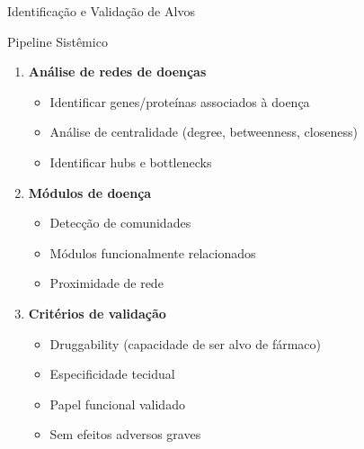 \begin{frame}{Identificação e Validação de Alvos}
\begin{block}{Pipeline Sistêmico}
\begin{enumerate}
    \item \textbf{Análise de redes de doenças}
    \begin{itemize}
        \item Identificar genes/proteínas associados à doença
        \item Análise de centralidade (degree, betweenness, closeness)
        \item Identificar hubs e bottlenecks
    \end{itemize}

    \item \textbf{Módulos de doença}
    \begin{itemize}
        \item Detecção de comunidades
        \item Módulos funcionalmente relacionados
        \item Proximidade de rede
    \end{itemize}

    \item \textbf{Critérios de validação}
    \begin{itemize}
        \item Druggability (capacidade de ser alvo de fármaco)
        \item Especificidade tecidual
        \item Papel funcional validado
        \item Sem efeitos adversos graves
    \end{itemize}
\end{enumerate}
\end{block}
\end{frame}

